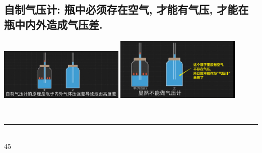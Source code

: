\documentclass[UTF8]{ctexart}
\begin{document}
	\subsection{自制气压计: 瓶中必须存在空气, 才能有气压, 才能在瓶中内外造成气压差.}
	
	\includegraphics[width=0.45\textwidth]{img/0034.png} 
	\includegraphics[width=0.45\textwidth]{img/0035.png} 
	
	
	
	
	~\\
	\hrule
	~\\
	
	
	
	45
	
	
	
	
\end{document}
